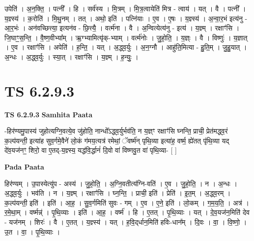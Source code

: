 \documentclass[17pt]{extarticle}
\begin{document}
उपेति॑ । अ॒न॒क्ति॒ । पत्नी᳚ । हि । सर्व॑स्य । मि॒त्रम् । मि॒त्र॒त्वायेति॑ मित्र - त्वाय॑ । यत् । वै । पत्नी᳚ । य॒ज्ञ्स्य॑ । क॒रोति॑ । मि॒थु॒नम् । तत् । अथो॒ इति॑ । पत्नि॑याः । ए॒व । ए॒षः । य॒ज्ञ्स्य॑ । अ॒न्वा॒र॒भं इत्य॑नु - आ॒र॒भंः । अन॑वच्छित्त्या॒ इत्यन॑व - छि॒त्त्यै॒ । वर्त्म॑ना । वै । अ॒न्वित्येत्य॑नु - इत्य॑ । य॒ज्ञ्म् । रक्षाꣳ॑सि । जि॒घाꣳ॒॒स॒न्ति॒ । वै॒ष्ण॒वीभ्या᳚म् । ऋ॒ग्भ्यामित्यृ॑क्-भ्याम् । वर्त्म॑नोः । जु॒हो॒ति॒ । य॒ज्ञ्ः । वै । विष्णुः॑ । य॒ज्ञात् । ए॒व । रक्षाꣳ॑सि । अपेति॑ । ह॒न्ति॒ । यत् । अ॒द्ध्व॒र्युः । अ॒न॒ग्नौ । आहु॑ति॒मित्या - हु॒ति॒म् । जु॒हु॒यात् । अ॒न्धः । अ॒द्ध्व॒र्युः । स्या॒त् । रक्षाꣳ॑सि । य॒ज्ञ्म् । ह॒न्युः॒ ।  \newline




\section*{ TS 6.2.9.3 }

\textbf{TS 6.2.9.3 } \newline
\textbf{Samhita Paata} \newline

-हिर॑ण्यमु॒पास्य॑ जुहोत्यग्नि॒वत्ये॒व जु॑होति॒ नान्धो᳚ऽद्ध्व॒र्युर्भव॑ति॒ न य॒ज्ञ्ꣳ रक्षाꣳ॑सि घ्नन्ति॒ प्राची॒ प्रेत॑मद्ध्व॒रं क॒ल्प॑यन्ती॒ इत्या॑ह सुव॒र्गमे॒वैने॑ लो॒कं ग॑मय॒त्यत्र॑ रमेथां॒ ॅवर्ष्म॑न् पृथि॒व्या इत्या॑ह॒ वर्ष्म॒ ह्ये॑तत् पृ॑थि॒व्या यद् दे॑व॒यज॑नꣳ॒॒ शिरो॒ वा ए॒तद्-य॒ज्ञ्स्य॒ यद्ध॑वि॒र्द्धानं॑ दि॒वो वा॑ विष्णवु॒त वा॑ पृथि॒व्या- [  ] \newline

\textbf{Pada Paata} \newline

हिर॑ण्यम् । उ॒पास्येत्यु॑प - अस्य॑ । जु॒हो॒ति॒ । अ॒ग्नि॒वतीत्य॑ग्नि-वति॑ । ए॒व । जु॒हो॒ति॒ । न । अ॒न्धः । अ॒द्ध्व॒र्युः । भव॑ति । न । य॒ज्ञ्म् । रक्षाꣳ॑सि । घ्न॒न्ति॒ । प्राची॒ इति॑ । प्रेति॑ । इ॒त॒म् । अ॒द्ध्व॒रम् । क॒ल्प॑यन्ती॒ इति॑ । इति॑ । आ॒ह॒ । सु॒व॒र्गमिति॑ सुवः - गम् । ए॒व । ए॒ने॒ इति॑ । लो॒कम् । ग॒म॒य॒ति॒ । अत्र॑ । र॒मे॒था॒म् । वर्ष्मन्न्॑ । पृ॒थि॒व्याः । इति॑ । आ॒ह॒ । वर्ष्म॑ । हि । ए॒तत् । पृ॒थि॒व्याः । यत् । दे॒व॒यज॑न॒मिति॑ देव - यज॑नम् । शिरः॑ । वै । ए॒तत् । य॒ज्ञ्स्य॑ । यत् । ह॒वि॒द्‌र्धान॒मिति॑ हविः-धान᳚म् । दि॒वः । वा॒ । वि॒ष्णो॒ । उ॒त । वा॒ । पृ॒थि॒व्याः ।  \newline




\end{document}
